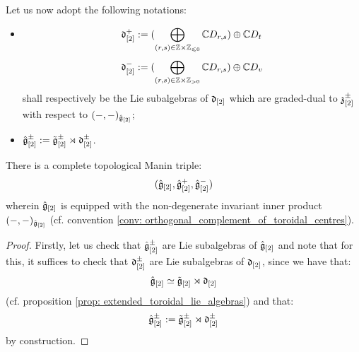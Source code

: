             \begin{convention} \label{conv: positive_and_negative_parts_of_derivation_subalgebras_of_extended_toroidal_algebras}
                Let us now adopt the following notations:
                \begin{itemize}
                    \item
                        $$\d_{[2]}^+ := ( \bigoplus_{(r, s) \in \Z \x \Z_{\leq 0} } \bbC D_{r, s} ) \oplus \bbC D_t$$
                        $$\d_{[2]}^- := ( \bigoplus_{(r, s) \in \Z \x \Z_{> 0} } \bbC D_{r, s} ) \oplus \bbC D_v$$
                    shall respectively be the Lie subalgebras of $\mathfrak{d}_{[2]}$ which are graded-dual to $\mathfrak{z}_{[2]}^{\pm}$ with respect to $(-, -)_{\hat{\mathfrak{g}}_{[2]}}$;
                    \item $\hat{\mathfrak{g}}_{[2]}^{\pm} := \tilde{\mathfrak{g}}_{[2]}^{\pm} \rtimes \mathfrak{d}_{[2]}^{\pm}$.
                \end{itemize}
            \end{convention}    
            \begin{theorem} \label{theorem: extended_toroidal_manin_triples}
                There is a complete topological Manin triple:
                    $$(\hat{\mathfrak{g}}_{[2]}, \hat{\mathfrak{g}}_{[2]}^+, \hat{\mathfrak{g}}_{[2]}^-)$$
                wherein $\hat{\mathfrak{g}}_{[2]}$ is equipped with the non-degenerate invariant inner product $(-, -)_{\hat{\mathfrak{g}}_{[2]}}$ (cf. convention \ref{conv: orthogonal_complement_of_toroidal_centres}).
            \end{theorem}
                \begin{proof}
                    Firstly, let us check that $\hat{\mathfrak{g}}_{[2]}^{\pm}$ are Lie subalgebras of $\hat{\mathfrak{g}}_{[2]}$ and note that for this, it suffices to check that $\mathfrak{d}_{[2]}^{\pm}$ are Lie subalgebras of $\mathfrak{d}_{[2]}$, since we have that:
                        $$\hat{\mathfrak{g}}_{[2]} \simeq \tilde{\mathfrak{g}}_{[2]} \rtimes \mathfrak{d}_{[2]}$$
                    (cf. proposition \ref{prop: extended_toroidal_lie_algebras}) and that:
                        $$\hat{\mathfrak{g}}_{[2]}^{\pm} := \tilde{\mathfrak{g}}_{[2]}^{\pm} \rtimes \mathfrak{d}_{[2]}^{\pm}$$
                    by construction. 
                \end{proof}

